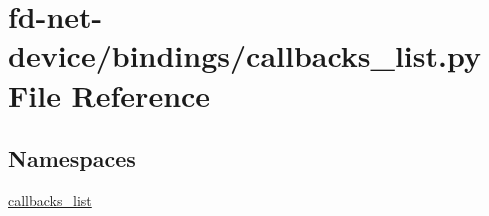 \hypertarget{fd-net-device_2bindings_2callbacks__list_8py}{}\section{fd-\/net-\/device/bindings/callbacks\+\_\+list.py File Reference}
\label{fd-net-device_2bindings_2callbacks__list_8py}
\subsection*{Namespaces}
\begin{DoxyCompactItemize}
\item 
 \hyperlink{namespacecallbacks__list}{callbacks\+\_\+list}
\end{DoxyCompactItemize}
